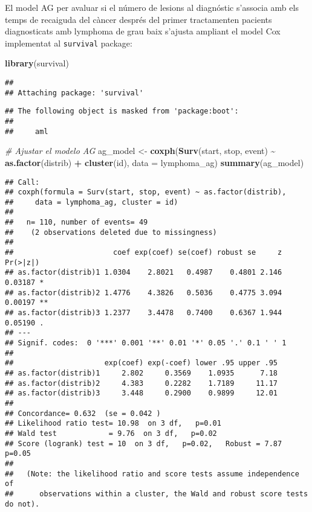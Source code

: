 \documentclass[
]{article}
\newenvironment{Shaded}{\begin{snugshade}}{\end{snugshade}}
\newcommand{\AttributeTok}[1]{\textcolor[rgb]{0.13,0.29,0.53}{#1}}
\newcommand{\CommentTok}[1]{\textcolor[rgb]{0.56,0.35,0.01}{\textit{#1}}}
\newcommand{\FunctionTok}[1]{\textcolor[rgb]{0.13,0.29,0.53}{\textbf{#1}}}
\newcommand{\NormalTok}[1]{#1}
\newcommand{\OtherTok}[1]{\textcolor[rgb]{0.56,0.35,0.01}{#1}}
\newcommand{\SpecialCharTok}[1]{\textcolor[rgb]{0.81,0.36,0.00}{\textbf{#1}}}
\begin{document}
El model AG per avaluar si el número de lesions al diagnóstic s'associa
amb els temps de recaiguda del càncer després del primer tractamenten
pacients diagnosticats amb lymphoma de grau baix s'ajusta ampliant el
model Cox implementat al \texttt{survival} package:

\begin{Shaded}
\begin{Highlighting}[]
\FunctionTok{library}\NormalTok{(survival)}
\end{Highlighting}
\end{Shaded}

\begin{verbatim}
## 
## Attaching package: 'survival'
\end{verbatim}

\begin{verbatim}
## The following object is masked from 'package:boot':
## 
##     aml
\end{verbatim}

\begin{Shaded}
\begin{Highlighting}[]
\CommentTok{\# Ajustar el modelo AG}
\NormalTok{ag\_model }\OtherTok{\textless{}{-}} \FunctionTok{coxph}\NormalTok{(}\FunctionTok{Surv}\NormalTok{(start, stop, event) }\SpecialCharTok{\textasciitilde{}} \FunctionTok{as.factor}\NormalTok{(distrib) }\SpecialCharTok{+} \FunctionTok{cluster}\NormalTok{(id), }\AttributeTok{data =}\NormalTok{ lymphoma\_ag)}
\FunctionTok{summary}\NormalTok{(ag\_model)}
\end{Highlighting}
\end{Shaded}

\begin{verbatim}
## Call:
## coxph(formula = Surv(start, stop, event) ~ as.factor(distrib), 
##     data = lymphoma_ag, cluster = id)
## 
##   n= 110, number of events= 49 
##    (2 observations deleted due to missingness)
## 
##                       coef exp(coef) se(coef) robust se     z Pr(>|z|)   
## as.factor(distrib)1 1.0304    2.8021   0.4987    0.4801 2.146  0.03187 * 
## as.factor(distrib)2 1.4776    4.3826   0.5036    0.4775 3.094  0.00197 **
## as.factor(distrib)3 1.2377    3.4478   0.7400    0.6367 1.944  0.05190 . 
## ---
## Signif. codes:  0 '***' 0.001 '**' 0.01 '*' 0.05 '.' 0.1 ' ' 1
## 
##                     exp(coef) exp(-coef) lower .95 upper .95
## as.factor(distrib)1     2.802     0.3569    1.0935      7.18
## as.factor(distrib)2     4.383     0.2282    1.7189     11.17
## as.factor(distrib)3     3.448     0.2900    0.9899     12.01
## 
## Concordance= 0.632  (se = 0.042 )
## Likelihood ratio test= 10.98  on 3 df,   p=0.01
## Wald test            = 9.76  on 3 df,   p=0.02
## Score (logrank) test = 10  on 3 df,   p=0.02,   Robust = 7.87  p=0.05
## 
##   (Note: the likelihood ratio and score tests assume independence of
##      observations within a cluster, the Wald and robust score tests do not).
\end{verbatim}
\end{document}

